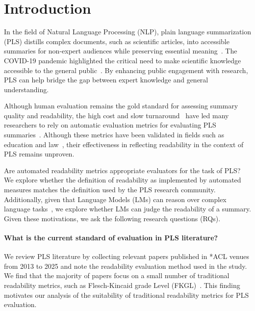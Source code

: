 \section{Introduction}

In the field of Natural Language Processing (NLP), plain language summarization (PLS) distills complex documents, such as scientific articles, into accessible summaries for non-expert audiences while preserving essential meaning~\cite{chandrasekaran2020overview}. The COVID-19 pandemic highlighted the critical need to make scientific knowledge accessible to the general public~\cite{wang-etal-2020-cord}. By enhancing public engagement with research, PLS can help bridge the gap between expert knowledge and general understanding.


Although human evaluation remains the gold standard for assessing summary quality and readability, the high cost and slow turnaround~\cite{Liu2022RevisitingTG} have led many researchers to rely on automatic evaluation metrics for evaluating PLS summaries~\cite{goldsack2022making,Guo2020AutomatedLL}. Although these metrics have been validated in fields such as education and law~\cite{ef903df0-98e8-341d-9e07-ada8904086a0, Han2024TheUO}, their effectiveness in reflecting readability in the context of PLS remains unproven.


Are automated readability metrics appropriate evaluators for the task of PLS? We explore whether the definition of readability as implemented by automated measures matches the definition used by the PLS research community. Additionally, given that Language Models (LMs) can reason over complex language tasks~\cite{Brown2020LanguageMA, Wei2022ChainOT, Yang2024DoLL}, we explore whether LMs can judge the readability of a summary. Given these motivations, we ask the following research questions (RQs).

\paragraph{{\rqone\label{rq1}}What is the current standard of evaluation in PLS literature?} 
We review PLS literature by collecting relevant papers published in *ACL venues from 2013 to 2025 and note the readability evaluation method used in the study. We find that the majority of papers focus on a small number of traditional readability metrics, such as Flesch-Kincaid grade Level (FKGL)~\cite{flesch1952simplification}.
This finding motivates our analysis of the suitability of traditional readability metrics for PLS evaluation.


